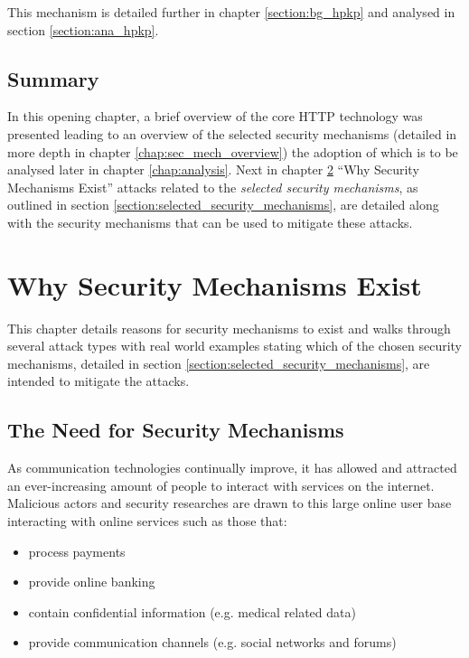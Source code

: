 \documentclass{mscreport}
\begin{document}
\vspace{0.3cm} \noindent
This mechanism is detailed further in chapter \ref{section:bg_hpkp} and analysed in section \ref{section:ana_hpkp}.
\newpage

%

\section{Summary}

In this opening chapter, a brief overview of the core HTTP technology was presented leading to an overview of the selected security mechanisms (detailed in more depth in chapter \ref{chap:sec_mech_overview}) the adoption of which is to be analysed later in chapter \ref{chap:analysis}. Next in chapter \ref{chap:sec_feat_exist} ``Why Security Mechanisms Exist'' attacks related to the \textit{selected security mechanisms}, as outlined in section \ref{section:selected_security_mechanisms}, are detailed along with the security mechanisms that can be used to mitigate these attacks.



\chapter{Why Security Mechanisms Exist}
\label{chap:sec_feat_exist}

This chapter details reasons for security mechanisms to exist and walks through several attack types with real world examples stating which of the chosen security mechanisms, detailed in section \ref{section:selected_security_mechanisms}, are intended to mitigate the attacks.

\section{The Need for Security Mechanisms}
\label{section:need_for_security_mechanisms}

As communication technologies continually improve, it has allowed and attracted an ever-increasing amount of people to interact with services on the internet. Malicious actors and security researches are drawn to this large online user base interacting with online services such as those that:
\begin{itemize}
	\setlength\itemsep{0.1em}
	\item process payments \cite{Herman2019-zb}
	\item provide online banking \cite{Gezer2019-oy}
	\item contain confidential information (e.g. medical related data) \cite{Mrdjenovich2020-vz}
	\item provide communication channels (e.g. social networks and forums)
\end{itemize}
\end{document}

